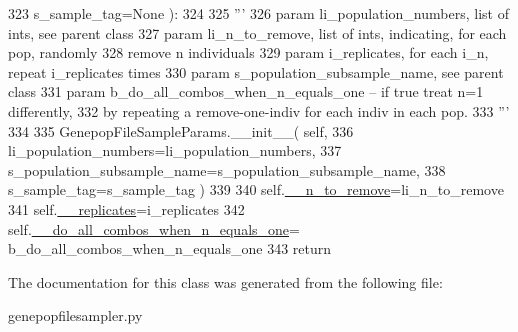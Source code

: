 \begin{DoxyCode}
323             s\_sample\_tag=\textcolor{keywordtype}{None} ):
324 
325         \textcolor{stringliteral}{'''}
326 \textcolor{stringliteral}{        param li\_population\_numbers, list of ints, see parent class}
327 \textcolor{stringliteral}{        param li\_n\_to\_remove, list of ints, indicating, for each pop, randomly }
328 \textcolor{stringliteral}{              remove n individuals}
329 \textcolor{stringliteral}{        param i\_replicates, for each i\_n, repeat i\_replicates times}
330 \textcolor{stringliteral}{        param s\_population\_subsample\_name, see parent class}
331 \textcolor{stringliteral}{        param b\_do\_all\_combos\_when\_n\_equals\_one -- if true treat n=1 differently,}
332 \textcolor{stringliteral}{              by repeating a remove-one-indiv for each indiv in each pop.}
333 \textcolor{stringliteral}{        '''}
334 
335         GenepopFileSampleParams.\_\_init\_\_( self, 
336                     li\_population\_numbers=li\_population\_numbers, 
337                     s\_population\_subsample\_name=s\_population\_subsample\_name,
338                     s\_sample\_tag=s\_sample\_tag )
339 
340         self.\hyperlink{classnegui_1_1genepopfilesampler_1_1GenepopFileSampleParamsRemoval_a23d601163d8118b7af9acf6acf78eecf}{\_\_n\_to\_remove}=li\_n\_to\_remove
341         self.\hyperlink{classnegui_1_1genepopfilesampler_1_1GenepopFileSampleParamsRemoval_ae2a4f45ac6b5377f749dc84a560dbf01}{\_\_replicates}=i\_replicates
342         self.\hyperlink{classnegui_1_1genepopfilesampler_1_1GenepopFileSampleParamsRemoval_a24a47d9cdac499238a1368dcc626e8a3}{\_\_do\_all\_combos\_when\_n\_equals\_one}=
      b\_do\_all\_combos\_when\_n\_equals\_one
343         \textcolor{keywordflow}{return}
\end{DoxyCode}


The documentation for this class was generated from the following file\+:\begin{DoxyCompactItemize}
\item 
genepopfilesampler.\+py\end{DoxyCompactItemize}
